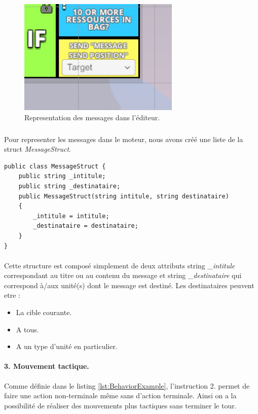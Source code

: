 \documentclass{report}
\begin{document}
\begin{figure}[!h]
       \centering
	\includegraphics[scale=0.55]{PuzzleMessageImage}
	\caption{Representation des messages dans l'éditeur.}
\end{figure}

\subparagraph{} 
Pour representer les messages dans le moteur, nous avons créé une liste de la struct \textit{MessageStruct}.

 \begin{lstlisting}[language={[Sharp]C},label={lst:MessageStructScript}, caption= Code du script MessageStruct.cs]
public class MessageStruct {
    public string _intitule;
    public string _destinataire;
    public MessageStruct(string intitule, string destinataire)
    {
        _intitule = intitule;
        _destinataire = destinataire;
    }
}
\end{lstlisting}

\paragraph{}
Cette structure est composé simplement de deux attributs string \textit{\_intitule} correspondant au titre ou au contenu du message et string \textit{\_destinataire} qui correspond à/aux unité(s) dont le message est destiné. Les destinataires peuvent etre :
\begin{itemize}
\item La cible courante.
\item A tous.
\item A un type d'unité en particulier.
\end{itemize}

\paragraph{3. Mouvement tactique.}
Comme définie dans le listing \ref{lst:BehaviorExample}, l'instruction 2. permet de faire une action non-terminale même sans d'action terminale.
Ainsi on a la possibilité de réaliser des mouvements plus tactiques sans terminer le tour.
\end{document}

